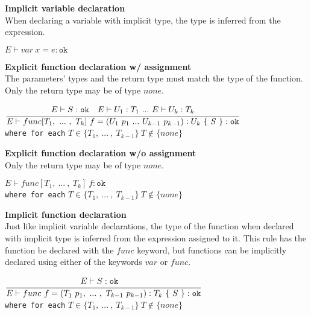 \textbf{Implicit variable declaration}\\
When declaring a variable with implicit type, the type is inferred from the expression.

\begin{center}
	\begin{math}
	E \vdash var\ x = e : \texttt{ok}
	\end{math}
\end{center}

\textbf{Explicit function declaration w/ assignment}\\
The parameters' types and the return type must match the type of the function.
Only the return type may be of type $none$.

\begin{center}
	\begin{math}
		\cfrac
		{E\vdash S : \texttt{ok}\quad E \vdash U_1 : T_1\
			.
			.
			.
			\ E \vdash U_k : T_k}
		{E \vdash func[T_1,\
			.
			.
			.
			\ ,\ T_k]\ f = (U_1\ p_1\
			.
			.
			.
			\ U_{k-1}\ p_{k-1}): U_k\ \{\ S\ \} : \texttt{ok}}
	\end{math}
	\\[1\baselineskip]
	\texttt{where for each} $T \in \{T_1,\ .
	.
	.
	\ ,\ T_{k-1}\}\ T \notin \{none\}$
\end{center}

\textbf{Explicit function declaration w/o assignment}\\
Only the return type may be of type $none$.

\begin{center}
	\begin{math}
	E \vdash func[T_1,\
		.
		.
		.
		\ ,\ T_k]\ f : \texttt{ok}
	\end{math}
	\\[1\baselineskip]
	\texttt{where for each} $T \in \{T_1,\ .
	.
	.
	\ ,\ T_{k-1}\}\ T \notin \{none\}$
\end{center}

\textbf{Implicit function declaration}\\
Just like implicit variable declarations, the type of the function when declared with implicit type is inferred from the expression assigned to it.
This rule has the function be declared with the $func$ keyword, but functions can be implicitly declared using either of the keywords $var$ or $func$.

\begin{center}
	\begin{math}
		\cfrac
		{E\vdash S : \texttt{ok}\quad}
		{E \vdash func\ f = (T_1\ p_1,\
		.
		.
		.
		\ ,\ T_{k-1}\ p_{k-1}): T_k\ \{\ S\ \} : \texttt{ok}}
	\end{math}
	\\[1\baselineskip]
	\texttt{where for each} $T \in \{T_1,\ .
	.
	.
	\ ,\ T_{k-1}\}\ T \notin \{none\}$
\end{center}

